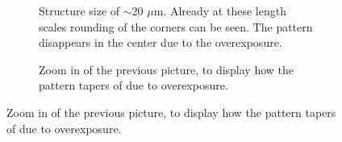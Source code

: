 \begin{figure}[htb]
    \centering
    \begin{subfigure}[t]{0.24\linewidth}
      	\caption{Structure size of $\sim$20 $\mu$m. Already at these length scales rounding of the corners can be seen. The pattern disappears in the center due to the overexposure.}
      	\label{fig:b2d22_q22}
    \end{subfigure}
    \hfill
    \begin{subfigure}[t]{0.24\linewidth}
      	\caption{Zoom in of the previous picture, to display how the pattern tapers of due to overexposure.}

\end{subfigure}
\end{figure}

